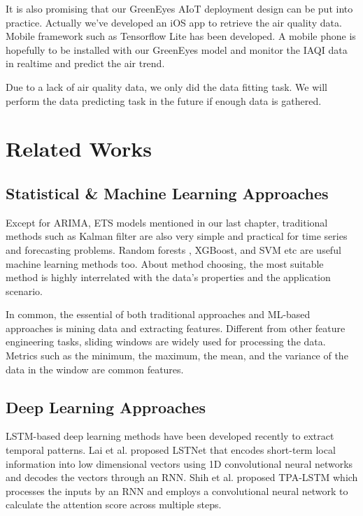 \documentclass[sigconf]{acmart}
\begin{document}

It is also promising that our GreenEyes AIoT deployment design can be put into practice. Actually we've developed an iOS app to retrieve the air quality data. Mobile framework such as Tensorflow Lite \cite{louis2019towards} has been developed. A mobile phone is hopefully to be installed with our GreenEyes model and monitor the IAQI data in realtime and predict the air trend.

Due to a lack of air quality data, we only did the data fitting task. We will perform the data predicting task in the future if enough data is gathered.

\section{Related Works}
\subsection{Statistical \& Machine Learning Approaches}

Except for ARIMA, ETS models mentioned in our last chapter, traditional methods such as Kalman filter \cite{gomez1994estimation} are also very simple and practical for time series and forecasting problems. Random forests \cite{rouet2017machine}, XGBoost, and SVM \cite{sapankevych2009time} etc are useful machine learning methods too. About method choosing, the most suitable method is highly interrelated with the data's properties and the application scenario. 

In common, the essential of both traditional approaches and ML-based approaches is mining data and extracting features. Different from other feature engineering tasks, sliding windows are widely used for processing the data. Metrics such as the minimum, the maximum, the mean, and the variance of the data in the window are common features.

\subsection{Deep Learning Approaches}

LSTM-based deep learning methods have been developed recently to extract temporal patterns. Lai et al. proposed LSTNet \cite{lai2018modeling} that encodes short-term local information into low dimensional vectors using 1D convolutional neural networks and decodes the vectors through an RNN. Shih et al. proposed TPA-LSTM \cite{shih2019temporal}  which processes the inputs by an RNN and employs a convolutional neural network to calculate the attention score across multiple steps.
\end{document}
